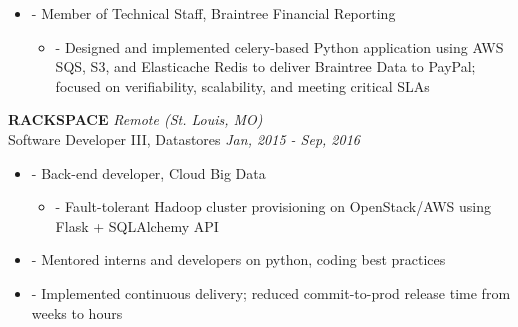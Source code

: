 \documentclass[a4paper,11pt]{article}
\newenvironment{pitemize}{
\begin{itemize}
\setlength{\itemsep}{.01in}
\setlength{\parskip}{.01in}
}
{\end{itemize}}
\begin{document}
\begin{pitemize}
\begin{pitemize}
    \item[-]Regularly produced tech talks for team and Data Lake users
    \item[-]Proposed, designed, and built Google API Proxy for PayPal to provide auditing and governance controls; used golang and custom protobuf compiler plugin to programmatically generate APIs instead of previous approach re-implementing using OpenAPI, resulting in vast decrease in development time
    \end{pitemize}
    \item[-]Member of Technical Staff, Braintree Financial Reporting
    \begin{pitemize}
        \item[-]Designed and implemented celery-based Python application using AWS SQS, S3, and Elasticache Redis to deliver Braintree Data to PayPal; focused on verifiability, scalability, and meeting critical SLAs
    \end{pitemize}
\end{pitemize}

\vspace{0.2in}
\textbf{RACKSPACE} \hfill \textit{Remote (St. Louis, MO)} \\
Software Developer III, Datastores \hfill \textit{Jan, 2015 - Sep, 2016}
\begin{pitemize}
    \item[-]Back-end developer, Cloud Big Data
    \begin{pitemize}
        \item[-]Fault-tolerant Hadoop cluster provisioning on OpenStack/AWS using Flask + SQLAlchemy API
    \end{pitemize}
\item[-]Mentored interns and developers on python, coding best practices
\item[-]Implemented continuous delivery; reduced commit-to-prod release time from weeks to hours
\end{pitemize}
\end{document}
